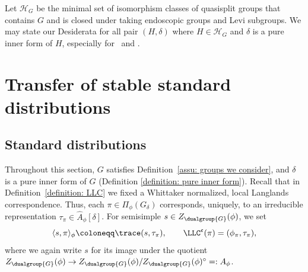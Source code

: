 \documentclass[11pt,letterpaper]{amsart}
\numberwithin{equation}{section}
\begin{document}
\begin{remark}\label{rmk LLC(2)}
    Let $\mathcal{H}_G$ be the minimal set of isomorphism classes of quasisplit groups that contains $G$ and is closed under taking endoscopic groups and Levi subgroups. We may state our Desiderata for all pair $(H,\delta)$ where $H \in \mathcal{H}_G$ and $\delta$ is a pure inner form of $H$, especially for \Sta \ and \ECR.
\end{remark}



\section{Transfer of stable standard distributions}\label{section: stable standards}



\subsection{Standard distributions}\label{subsection: standard distributions}

Throughout this section, $G$ satisfies Definition~\ref{assu: groups we consider}, and $\delta$ is a pure inner form of $G$ (Definition \ref{definition: pure inner form}).
Recall that in Definition~\ref{definition: LLC} we fixed a Whittaker normalized, local Langlands correspondence.
Thus, each $\pi \in \Pi_\phi(G_\delta)$ corresponds, uniquely, to an irreducible representation $\tau_\pi \in \widehat{A}_\phi[\delta]$.
For semisimple $s\in Z_{\dualgroup{G}}(\phi)$, we set
\begin{equation}\label{equation: pairing phi}
    \langle s,\pi \rangle_\phi \coloneqq \trace(s,\tau_\pi), \qquad
    \LLC^\mathfrak{e}(\pi) = (\phi_\pi,\tau_\pi),
\end{equation}    
    where we again write $s$ for its image under the quotient $Z_{\dualgroup{G}}(\phi) \to Z_{\dualgroup{G}}(\phi)/Z_{\dualgroup{G}}(\phi)^\circ =: A_\phi$.
\end{document}
